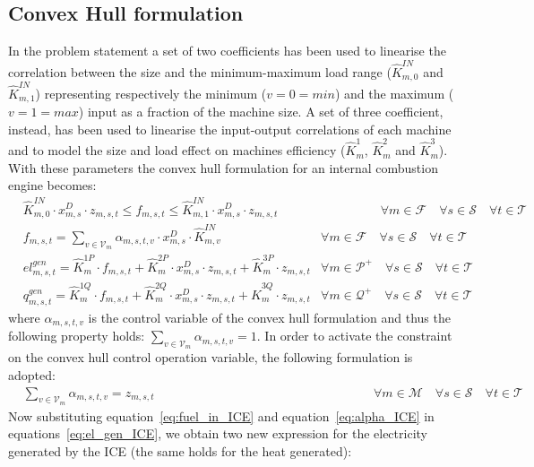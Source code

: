 \documentclass{article}
\newcommand{\cT}{{\mathcal T}}
\newcommand{\cM}{{\mathcal M}}
\newcommand{\cP}{{\mathcal P}}
\newcommand{\cQ}{{\mathcal Q}}
\newcommand{\cF}{{\mathcal F}}
\newcommand{\cS}{{\mathcal S}}
\newcommand{\cV}{{\mathcal V}}
\begin{document}
{\subsection{Convex Hull formulation}
In the problem statement a set of two coefficients has been used to linearise the correlation between the size and the minimum-maximum load range ($\hat{K}_{m,0}^{IN}$ and $\hat{K}_{m,1}^{IN}$) representing respectively the minimum ($v=0=min$) and the maximum ($v=1=max$) input as a fraction of the machine size.
A set of three coefficient, instead, has been used to linearise the input-output correlations of each machine and to model the size and load effect on machines efficiency ($\hat{K}_{m}^{1}$, $\hat{K}_{m}^{2}$ and $\hat{K}_{m}^{3}$). 
With these parameters the convex hull formulation for an internal combustion engine becomes: 
		\begin{align}
		& \hat{K}_{m,0}^{IN} \cdot x_{m,s}^{D} \cdot z_{m,s,t} \leq f_{m,s,t} \leq \hat{K}_{m,1}^{IN} \cdot x_{m,s}^D \cdot z_{m,s,t} & \hspace{2cm} \forall m \in \cF \quad \forall s \in \cS \quad \forall t \in \cT \label{eq:fuel_limit_ICE}\\
		& f_{m,s,t} = \sum_{v \in \cV_m} \alpha_{m,s,t,v} \cdot x_{m,s}^D \cdot \hat{K}_{m,v}^{IN} & \forall m \in \cF \quad \forall s \in \cS \quad \forall t \in \cT \label{eq:fuel_in_ICE}\\
		& el_{m,s,t}^{gen} = \hat{K}_{m}^{1P} \cdot f_{m,s,t} + \hat{K}_{m}^{2P} \cdot x_{m,s}^{D} \cdot z_{m,s,t} + \hat{K}_{m}^{3P} \cdot z_{m,s,t} & \forall m \in \cP^+ \quad \forall s \in \cS \quad \forall t \in \cT \label{eq:el_gen_ICE}\\
		& q_{m,s,t}^{gen} = \hat{K}_{m}^{1Q} \cdot f_{m,s,t} + \hat{K}_{m}^{2Q} \cdot x_{m,s}^{D} \cdot z_{m,s,t} + \hat{K}_{m}^{3Q} \cdot z_{m,s,t} &\forall m \in \cQ^+ \quad \forall s \in \cS \quad \forall t \in \cT \label{eq:heat_gen_ICE}
		\end{align}		
where $\alpha_{m,s,t,v}$ is the control variable of the convex hull formulation and thus the following property holds: $\sum_{v \in \cV_m} \alpha_{m,s,t,v} = 1$. In order to activate the constraint on the convex hull control operation variable, the following formulation is adopted: 
\begin{align}
&\sum_{v \in \cV_m} \alpha_{m,s,t,v} = z_{m,s,t} & \hspace{7cm} \forall m \in \cM \quad \forall s \in \cS \quad \forall t \in \cT \label{eq:alpha_ICE} 
\end{align}
Now substituting equation~\eqref{eq:fuel_in_ICE} and equation~\eqref{eq:alpha_ICE} in equations~\eqref{eq:el_gen_ICE}, we obtain two new expression for the electricity generated by the ICE (the same holds for the heat generated):
}
\end{document}
